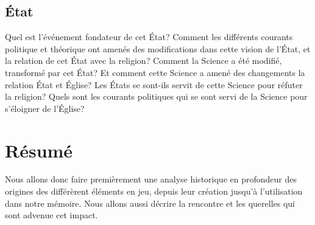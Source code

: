 \documentclass{article}
\begin{document}
\subsection{État}

Quel est l'\'ev\'enement fondateur de cet État? Comment les diff\'erents courants
politique et th\'eorique ont amen\'es des modifications dans cette vision de l'État,
et la relation de cet État avec la religion? Comment la Science a \'et\'e modifi\'e,
transform\'e par cet État? Et comment cette Science a amen\'e des changements la
relation État et Église? Les États se sont-ils servit de cette Science pour
r\'efuter la religion? Quels sont les courants politiques qui se sont servi de la
Science pour s'\'eloigner de l'Église?

\section{R\'esum\'e}

Nous allons donc faire premi\`erement une analyse historique en profondeur des
origines des diff\'er\`erent \'el\'ements en jeu, depuis leur cr\'eation jusqu'\`a
l'utilisation dans notre m\'emoire. Nous allons aussi d\'ecrire la rencontre et les
querelles qui sont advenue cet impact.
\end{document}
